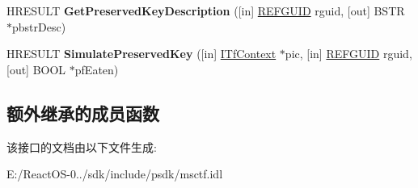 \begin{DoxyCompactItemize}
\item 
\mbox{\label{interface_i_tf_keystroke_mgr_afeec57c940ec88b3d83aee826379f1de}} 
H\+R\+E\+S\+U\+LT {\bfseries Get\+Preserved\+Key\+Description} (\mbox{[}in\mbox{]} \hyperlink{struct___g_u_i_d}{R\+E\+F\+G\+U\+ID} rguid, \mbox{[}out\mbox{]} B\+S\+TR $\ast$pbstr\+Desc)
\item 
\mbox{\label{interface_i_tf_keystroke_mgr_a9f2f6389c2edb6729c99991478860809}} 
H\+R\+E\+S\+U\+LT {\bfseries Simulate\+Preserved\+Key} (\mbox{[}in\mbox{]} \hyperlink{interface_i_tf_context}{I\+Tf\+Context} $\ast$pic, \mbox{[}in\mbox{]} \hyperlink{struct___g_u_i_d}{R\+E\+F\+G\+U\+ID} rguid, \mbox{[}out\mbox{]} B\+O\+OL $\ast$pf\+Eaten)
\end{DoxyCompactItemize}
\subsection*{额外继承的成员函数}


该接口的文档由以下文件生成\+:\begin{DoxyCompactItemize}
\item 
E\+:/\+React\+O\+S-\/0../sdk/include/psdk/msctf.\+idl\end{DoxyCompactItemize}
